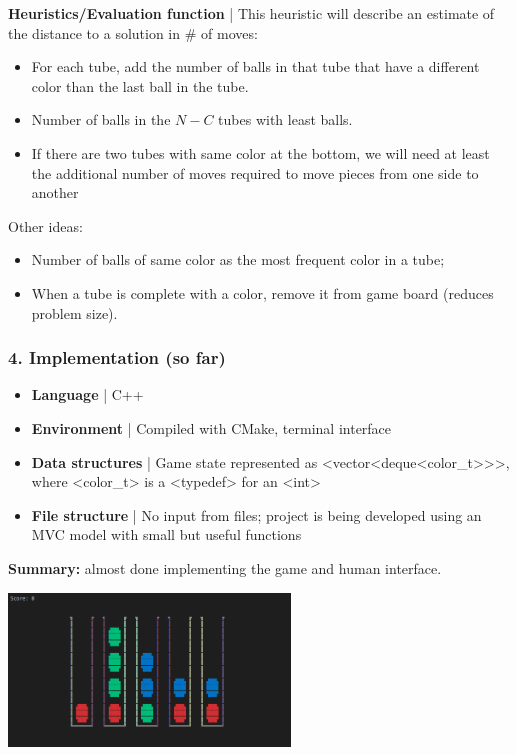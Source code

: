 \documentclass{beamer}
\def\texttt#1{<#1>}
\begin{document}
\begin{frame}
  \textbf{Heuristics/Evaluation function} | This heuristic will describe an estimate of the distance to a solution in \# of moves:
  \begin{itemize}
    \item For each tube, add the number of balls in that tube that have a different color than the last ball in the tube.
    \item Number of balls in the $N-C$ tubes with least balls.
    \item If there are two tubes with same color at the bottom, we will need at least the additional number of moves required to move pieces from one side to another
  \end{itemize}

  Other ideas:
  \begin{itemize}
    \item Number of balls of same color as the most frequent color in a tube;
    \item When a tube is complete with a color, remove it from game board (reduces problem size).
  \end{itemize}
\end{frame}

\begin{frame}
\frametitle{4. Implementation (so far)}

\begin{itemize}
  \item \textbf{Language} | C++
  \item \textbf{Environment} | Compiled with CMake, terminal interface
  \item \textbf{Data structures} | Game state represented as \texttt{vector<deque<color\_t>>}, where \texttt{color\_t} is a \texttt{typedef} for an \texttt{int}
  \item \textbf{File structure} | No input from files; project is being developed using an MVC model with small but useful functions
\end{itemize}

\textbf{Summary:} almost done implementing the game and human interface.

\begin{center}
  \includegraphics[width=75mm]{img/game-interface.png}
\end{center}

\end{frame}
\end{document}
